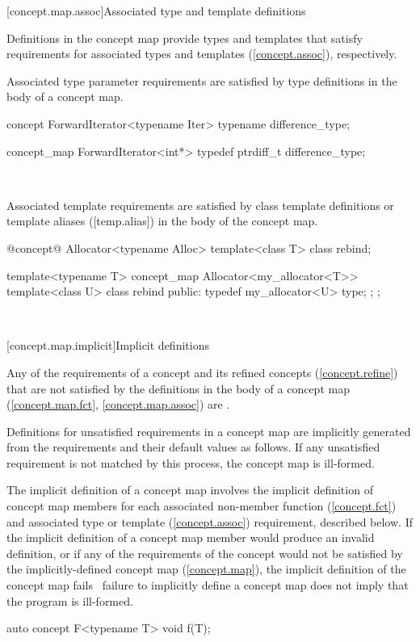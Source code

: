 \documentclass[american]{book}
\begin{document}
\begin{paras}
[concept.map.assoc]{Associated type and template definitions}

\pnum
Definitions in the concept map provide types and templates
that satisfy requirements for associated types and templates
(\ref{concept.assoc}), respectively.

\pnum
Associated type parameter requirements are satisfied by type definitions in the
body of a concept map. \enterexample\
\begin{codeblock}
concept ForwardIterator<typename Iter> {
  typename difference_type;
}

concept_map ForwardIterator<int*> {
  typedef ptrdiff_t difference_type;
}
\end{codeblock}
\exitexample\

\pnum
Associated template requirements are satisfied by class template
definitions or template aliases ([temp.alias]) in the body of the concept map. \enterexample\
\begin{codeblock}
@\textcolor{addclr}{concept}@ Allocator<typename Alloc> {
  template<class T> class rebind;
}

template<typename T>
concept_map Allocator<my_allocator<T>> {
  template<class U>
    class rebind {
    public:
      typedef my_allocator<U> type;
    };
};
\end{codeblock}
\exitexample\

[concept.map.implicit]{Implicit definitions}

\pnum
Any of the requirements of a concept and its refined concepts
(\ref{concept.refine}) that are not 
satisfied by the definitions in the body of a concept map
(\ref{concept.map.fct}, \ref{concept.map.assoc}) are
\techterm{unsatisfied requirements}. 

\pnum
Definitions for unsatisfied requirements in a concept map are
implicitly generated from the requirements and their default values as
follows. If any unsatisfied requirement is not
matched by this process, the concept map is ill-formed.

\pnum
The implicit definition of a concept map involves the implicit
definition of concept map members for each associated non-member function
(\ref{concept.fct}) and associated type or template (\ref{concept.assoc})
requirement, described below. If the implicit definition of a concept 
map member would produce an invalid definition, or if any of the
requirements of the concept would not be satisfied by the
implicitly-defined concept map (\ref{concept.map}), the implicit definition of 
the concept map fails \enternote\ failure to implicitly define a
concept map does not imply that the program is ill-formed. \exitnote\ 
\enterexample\
\begin{codeblock}
auto concept F<typename T> {
  void f(T);
}


\end{codeblock}
\end{paras}
\end{document}
